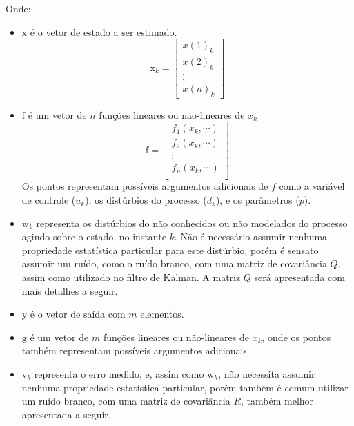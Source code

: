 \noindent
Onde: 
\begin{itemize}
	\item $\mathrm{x}$ é o vetor de estado a ser estimado.
		\begin{equation}
			\mathrm{x}_k =
			\begin{bmatrix}
				x(1)_{k} \\
				x(2)_{k} \\
				\vdots \\
				x(n)_{k}
			\end{bmatrix}
		\end{equation}
		
	\item $\mathrm{f}$ é um vetor de $n$ funções lineares ou não-lineares de $x_k$
		\begin{equation}
			\mathrm{f} =
			\begin{bmatrix}
				f_1(x_k, \cdots) \\
				f_2(x_k, \cdots) \\
				\vdots \\
				f_n(x_k, \cdots) \\
			\end{bmatrix}
		\end{equation}
		Os pontos representam possíveis argumentos adicionais de $f$ como a variável de
		controle ($u_k$), os distúrbios do processo ($d_k$), e os parâmetros ($p$).
		
	\item $\mathrm{w}_k$ representa os distúrbios do não conhecidos ou não modelados do processo
			agindo sobre o estado, no instante $k$. Não é necessário assumir nenhuma propriedade
			estatística particular para este distúrbio, porém é sensato assumir um ruído, como o
			ruído branco, com uma matriz de covariância $Q$, assim como utilizado no filtro de
			Kalman. A matriz $Q$ será apresentada com mais detalhes a seguir.
	
	\item $\mathrm{y}$ é o vetor de saída com $m$ elementos.
	
	\item $\mathrm{g}$ é um vetor de $m$ funções lineares ou não-lineares de $x_k$, onde os pontos
			também representam possíveis argumentos adicionais.

	\item $\mathrm{v}_k$ representa o erro medido, e, assim como $\mathrm{w}_k$, não necessita
			assumir nenhuma propriedade estatística particular, porém também é comum utilizar
			um ruído branco, com uma matriz de covariância $R$, também melhor apresentada a
			seguir.
	
\end{itemize}

